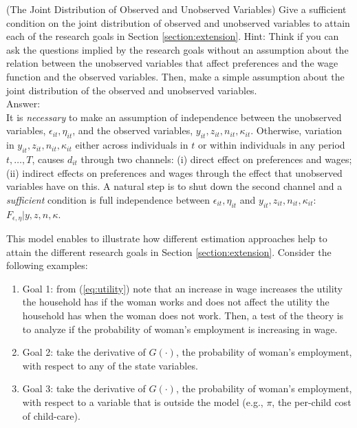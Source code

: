 \begin{exercise} (The Joint Distribution of Observed and Unobserved Variables)
Give a sufficient condition on the joint distribution of observed and unobserved variables to attain each of the research goals in Section \ref{section:extension}. Hint: Think if you can ask the questions implied by the research goals without an assumption about the relation between the unobserved variables that affect preferences and the wage function and the observed variables. Then, make a simple assumption about the joint distribution of the observed and unobserved variables.\\
\noindent Answer:\\
\noindent It is \emph{necessary} to make an assumption of independence between the unobserved variables, $\epsilon_{it}, \eta_{it}$, and the observed variables, $y_{it}, z_{it}, n_{it}, \kappa_{it}$. Otherwise, variation in $y_{it}, z_{it}, n_{it}, \kappa_{it}$ either across individuals in $t$ or within individuals in any period $t, \ldots, T$, causes $d_{it}$ through two channels: (i) direct effect on preferences and  wages; (ii) indirect effects on preferences and wages through the effect that unobserved variables have on this. A natural step is to shut down the second channel and a \emph{sufficient} condition is full independence between $\epsilon_{it}, \eta_{it}$ and  $y_{it}, z_{it}, n_{it}, \kappa_{it}$: $F_{\epsilon, \eta}|y, z, n, \kappa$.
\end{exercise}

\indent This model enables to illustrate how different estimation approaches help to attain the different research goals in Section \ref{section:extension}. Consider the following examples:
\begin{enumerate}
\item Goal 1: from (\ref{eq:utility}) note that an increase in wage increases the utility the household has if the woman works and does not affect the utility the household has when the woman does not work. Then, a test of the theory is to analyze if the probability of woman's employment is increasing in wage. 
\item Goal 2: take the derivative of $G(\cdot)$, the probability of woman's employment, with respect to any of the state variables.
\item Goal 3: take the derivative of $G(\cdot)$, the probability of woman's employment, with respect to a variable that is outside the model (e.g., $\pi$, the per-child cost of child-care). 
\end{enumerate}

